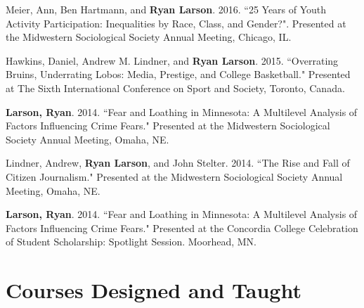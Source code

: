 \documentclass[letterpaper]{article}
\renewenvironment{itemize}{
  \begin{list}{}{
    \setlength{\leftmargin}{1.5em}
  }
}{
  \end{list}
}
\begin{document}
\begin{itemize}
\item Meier, Ann, Ben Hartmann, and \textbf{Ryan Larson}. 2016. ``25 Years of Youth Activity Participation: Inequalities by Race, Class, and Gender?". Presented at the Midwestern Sociological Society Annual Meeting, Chicago, IL. 
\item Hawkins, Daniel, Andrew M. Lindner, and \textbf{Ryan Larson}. 2015. ``Overrating Bruins, Underrating Lobos: Media, Prestige, and College Basketball." Presented at The Sixth International Conference on Sport and Society, Toronto, Canada.
\item \textbf{Larson, Ryan}. 2014. ``Fear and Loathing in Minnesota: A Multilevel Analysis of Factors Influencing Crime Fears." Presented at the Midwestern Sociological Society Annual Meeting, Omaha, NE.
\item Lindner, Andrew, \textbf{Ryan Larson}, and John Stelter. 2014. ``The Rise and Fall of Citizen Journalism." Presented at the Midwestern Sociological Society Annual Meeting, Omaha, NE. 
\item \textbf{Larson, Ryan}. 2014. ``Fear and Loathing in Minnesota: A Multilevel Analysis of Factors Influencing Crime Fears." Presented at the Concordia College Celebration of Student Scholarship: Spotlight Session. Moorhead, MN. 


\end{itemize}


\section*{\textbf{Courses Designed and Taught}}
\end{document}
